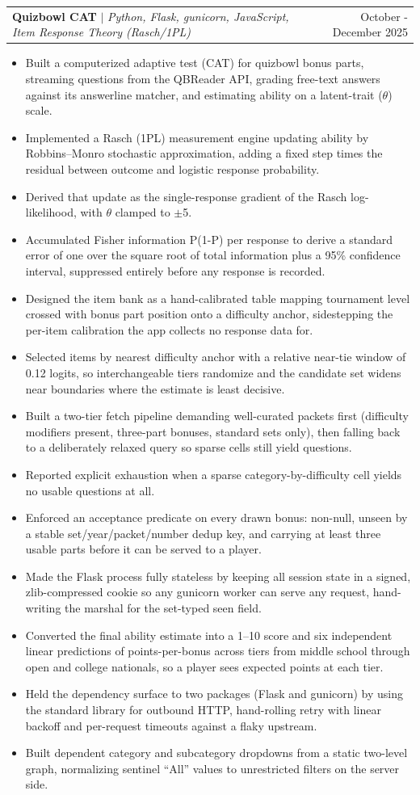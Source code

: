 \documentclass[letterpaper,11pt]{article}
\makeatletter
\newcommand{\resumeItem}[1]{
  \item\small{
    {#1 \vspace{-2pt}}
  }
}
\newcommand{\resumeProjectHeading}[2]{
    \item
    \begin{tabular*}{0.97\textwidth}{l@{\extracolsep{\fill}}r}
      \small#1 & #2 \\
    \end{tabular*}\vspace{-7pt}
}
\newcommand{\resumeItemListStart}{\begin{itemize}}
\newcommand{\resumeItemListEnd}{\end{itemize}\vspace{-5pt}}
\makeatother
\begin{document}
      \resumeProjectHeading
          {\textbf{Quizbowl CAT} $|$ \emph{Python, Flask, gunicorn, JavaScript, Item Response Theory (Rasch/1PL)}}{October - December 2025}
          \resumeItemListStart
            \resumeItem{Built a computerized adaptive test (CAT) for quizbowl bonus parts, streaming questions from the QBReader API, grading free-text answers against its answerline matcher, and estimating ability on a latent-trait ($\theta$) scale.}
            \resumeItem{Implemented a Rasch (1PL) measurement engine updating ability by Robbins--Monro stochastic approximation, adding a fixed step times the residual between outcome and logistic response probability.}
            \resumeItem{Derived that update as the single-response gradient of the Rasch log-likelihood, with $\theta$ clamped to $\pm$5.}
            \resumeItem{Accumulated Fisher information P(1-P) per response to derive a standard error of one over the square root of total information plus a 95\% confidence interval, suppressed entirely before any response is recorded.}
            \resumeItem{Designed the item bank as a hand-calibrated table mapping tournament level crossed with bonus part position onto a difficulty anchor, sidestepping the per-item calibration the app collects no response data for.}
            \resumeItem{Selected items by nearest difficulty anchor with a relative near-tie window of 0.12 logits, so interchangeable tiers randomize and the candidate set widens near boundaries where the estimate is least decisive.}
            \resumeItem{Built a two-tier fetch pipeline demanding well-curated packets first (difficulty modifiers present, three-part bonuses, standard sets only), then falling back to a deliberately relaxed query so sparse cells still yield questions.}
            \resumeItem{Reported explicit exhaustion when a sparse category-by-difficulty cell yields no usable questions at all.}
            \resumeItem{Enforced an acceptance predicate on every drawn bonus: non-null, unseen by a stable set/year/packet/number dedup key, and carrying at least three usable parts before it can be served to a player.}
            \resumeItem{Made the Flask process fully stateless by keeping all session state in a signed, zlib-compressed cookie so any gunicorn worker can serve any request, hand-writing the marshal for the set-typed seen field.}
            \resumeItem{Converted the final ability estimate into a 1--10 score and six independent linear predictions of points-per-bonus across tiers from middle school through open and college nationals, so a player sees expected points at each tier.}
            \resumeItem{Held the dependency surface to two packages (Flask and gunicorn) by using the standard library for outbound HTTP, hand-rolling retry with linear backoff and per-request timeouts against a flaky upstream.}
            \resumeItem{Built dependent category and subcategory dropdowns from a static two-level graph, normalizing sentinel ``All'' values to unrestricted filters on the server side.}
          \resumeItemListEnd
\end{document}
